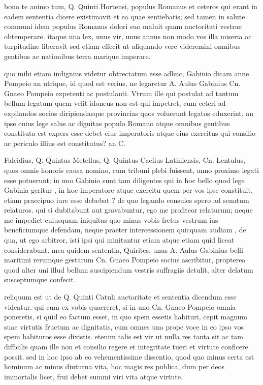 bono te animo tum, Q. Quinti Hortensi, populus Romanus et ceteros qui erant in eadem sententia dicere existimavit et ea quae sentiebatis; sed tamen in salute communi idem populus Romanus dolori suo maluit quam auctoritati vestrae obtemperare. itaque una lex, unus vir, unus annus non modo vos illa miseria ac turpitudine liberavit sed etiam effecit ut aliquando vere videremini omnibus gentibus ac nationibus terra marique imperare.

 quo mihi etiam indignius videtur obtrectatum esse adhuc, Gabinio dicam anne Pompeio an utrique, id quod est verius, ne legaretur A. Aulus Gabinius Cn. Gnaeo Pompeio expetenti ac postulanti. Vtrum ille qui postulat ad tantum bellum legatum quem velit idoneus non est qui impetret, cum ceteri ad expilandos socios diripiendasque provincias quos voluerunt legatos eduxerint, an ipse cuius lege salus ac dignitas populo Romano atque omnibus gentibus constituta est expers esse debet eius imperatoris atque eius exercitus qui consilio ac periculo illius est constitutus? an C.

 Falcidius, Q. Quintus Metellus, Q. Quintus Caelius Latiniensis, Cn. Lentulus, quos omnis honoris causa nomino, cum tribuni plebi fuissent, anno proximo legati esse potuerunt; in uno Gabinio sunt tam diligentes qui in hoc bello quod lege Gabinia geritur , in hoc imperatore atque exercitu quem per vos ipse constituit, etiam praecipuo iure esse debebat ? de quo legando consules spero ad senatum relaturos. qui si dubitabunt aut gravabuntur, ego me profiteor relaturum; neque me impediet cuiusquam iniquitas quo minus vobis fretus vestrum ius beneficiumque defendam, neque praeter intercessionem quicquam audiam , de qua, ut ego arbitror, isti ipsi qui minitantur etiam atque etiam quid liceat considerabunt. mea quidem sententia, Quirites, unus A. Aulus Gabinius belli maritimi rerumque gestarum Cn. Gnaeo Pompeio socius ascribitur, propterea quod alter uni illud bellum suscipiendum vestris suffragiis detulit, alter delatum susceptumque confecit.

 reliquum est ut de Q. Quinti Catuli auctoritate et sententia dicendum esse videatur. qui cum ex vobis quaereret, si in uno Cn. Gnaeo Pompeio omnia poneretis, si quid eo factum esset, in quo spem essetis habituri, cepit magnum suae virtutis fructum ac dignitatis, cum omnes una prope voce in eo ipso vos spem habituros esse dixistis. etenim talis est vir ut nulla res tanta sit ac tam difficilis quam ille non et consilio regere et integritate tueri et virtute conficere possit. sed in hoc ipso ab eo vehementissime dissentio, quod quo minus certa est hominum ac minus diuturna vita, hoc magis res publica, dum per deos immortalis licet, frui debet summi viri vita atque virtute.

